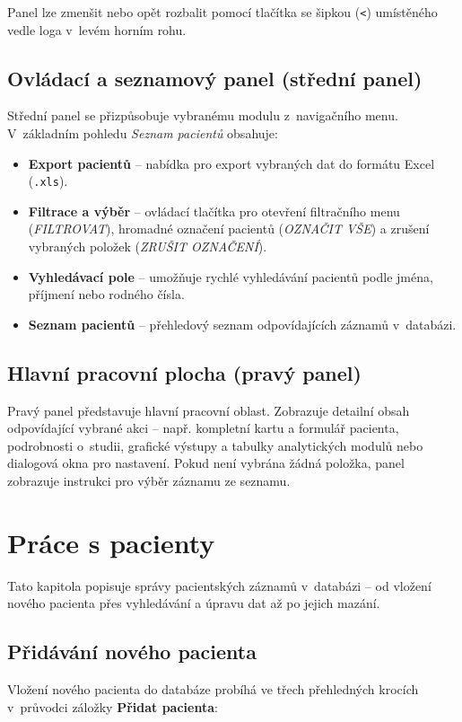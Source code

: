 \documentclass[12pt,a4paper]{article}
\begin{document}
Panel lze zmenšit nebo opět rozbalit pomocí tlačítka se šipkou (\texttt{<}) umístěného vedle loga v~levém horním rohu.

\subsection{Ovládací a seznamový panel (střední panel)}
Střední panel se přizpůsobuje vybranému modulu z~navigačního menu. V~základním pohledu \textit{Seznam pacientů} obsahuje:
\begin{itemize}
    \item \textbf{Export pacientů} -- nabídka pro export vybraných dat do formátu Excel (\texttt{.xls}).
    \item \textbf{Filtrace a výběr} -- ovládací tlačítka pro otevření filtračního menu (\textit{FILTROVAT}), hromadné označení pacientů (\textit{OZNAČIT VŠE}) a zrušení vybraných položek (\textit{ZRUŠIT OZNAČENÍ}).
    \item \textbf{Vyhledávací pole} -- umožňuje rychlé vyhledávání pacientů podle jména, příjmení nebo rodného čísla.
    \item \textbf{Seznam pacientů} -- přehledový seznam odpovídajících záznamů v~databázi.
\end{itemize}

\subsection{Hlavní pracovní plocha (pravý panel)}
Pravý panel představuje hlavní pracovní oblast. Zobrazuje detailní obsah odpovídající vybrané akci -- např. kompletní kartu a formulář pacienta, podrobnosti o~studii, grafické výstupy a tabulky analytických modulů nebo dialogová okna pro nastavení. Pokud není vybrána žádná položka, panel zobrazuje instrukci pro výběr záznamu ze seznamu.

\section{Práce s pacienty}

Tato kapitola popisuje správy pacientských záznamů v~databázi -- od vložení nového pacienta přes vyhledávání a úpravu dat až po jejich mazání.

\subsection{Přidávání nového pacienta}

Vložení nového pacienta do databáze probíhá ve třech přehledných krocích v~průvodci záložky \textbf{Přidat pacienta}:
\end{document}
